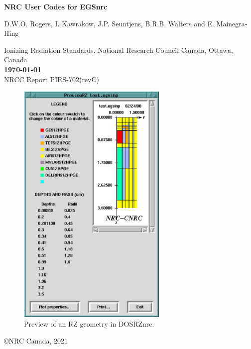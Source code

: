 \documentclass[12pt,twoside]{article}  %
\newcommand{\cen}[1]{\begin{center} #1 \end{center} }
\begin{document}
\begin{center}
{\sffamily \bfseries {\Huge NRC User Codes for EGSnrc}
\vspace{5mm}\\}
\begin{Large}
D.W.O. Rogers, I. Kawrakow, J.P. Seuntjens,  B.R.B. Walters and E.
Mainegra-Hing \\
\end{Large}
Ionizing Radiation Standards,
National Research Council Canada, Ottawa, Canada\\


\vspace{3mm}
{\bfseries
\today}
\vspace{3mm}\\
\hfill NRCC Report {\sf PIRS-702(revC)} \vspace*{2mm}\\

\begin{figure}[h]
\begin{center}
\includegraphics[height=12cm]{figures/PreviewRZ_example}
\\Preview of an RZ geometry in DOSRZnrc.
\end{center}
\end{figure}

\vfill
\begin{latexonly}
\end{latexonly}

\copyright NRC Canada, 2021
\end{center}
\newpage   %
\mbox{}
\end{document}
